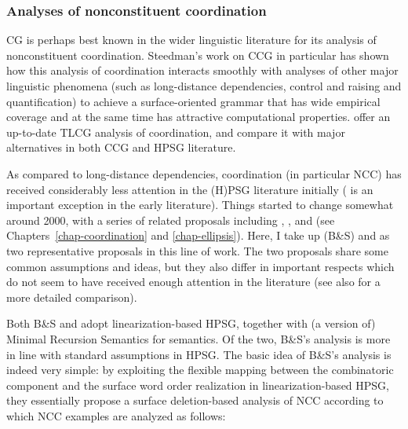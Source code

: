 \documentclass[output=paper]{langsci/langscibook}
\begin{document}
\subsubsection{Analyses of nonconstituent coordination  \label{NCCcomparison}}

CG is perhaps best known in the wider linguistic literature for its
analysis of nonconstituent coordination. Steedman's work on CCG
\citep{Steedman97a,Steedman2000a-u,steedman2012} in particular has shown
how this analysis of coordination interacts smoothly with analyses of
other major linguistic phenomena (such as long-distance dependencies,
control and raising and quantification) to achieve a surface-oriented
grammar that has wide empirical coverage and at the same time has
attractive computational properties. \citet{kubota-levine-coord} offer 
an up-to-date TLCG analysis of coordination, and compare it with
major alternatives in both CCG and HPSG literature.


As compared to long-distance dependencies, coordination (in particular
NCC) has received considerably less attention in the (H)PSG literature
initially (\citet{sgww} is an important exception in the early literature).
Things started to change somewhat around 2000, with a series of
related proposals including \citet{Yatabe2001a}, \citet{Crysmann2003c}, \citet{BS2004a}
and \citet{chaves07} (see Chapters~\ref{chap-coordination} and
\ref{chap-ellipsis}). Here, I take up \citet{BS2004a} (B\&S) and
\citet{Yatabe2001a} as two representative proposals in this line of work.
The two proposals share some common assumptions and ideas, but they
also differ in important respects which do not seem to have received
enough attention in the literature (see also \citet{yatabe-tam2017} for a
more detailed comparison).

Both B\&S and \citet{Yatabe2001a} adopt linearization-based HPSG, together
with (a version of) Minimal Recursion Semantics for
semantics. Of the two, B\&S's
analysis is more in line with standard assumptions in HPSG. The basic
idea of B\&S's analysis is indeed very simple: by exploiting the flexible
mapping between the combinatoric component and the surface word order
realization in linearization-based HPSG, they essentially propose a
surface deletion-based analysis of NCC according to which NCC examples
are analyzed as follows:
\end{document}
